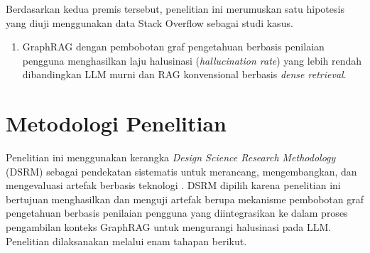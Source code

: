 Berdasarkan kedua premis tersebut, penelitian ini merumuskan satu hipotesis yang diuji menggunakan data Stack Overflow sebagai studi kasus.

\begin{enumerate}
    \item[\textbf{H1}] GraphRAG dengan pembobotan graf pengetahuan berbasis penilaian pengguna menghasilkan laju halusinasi (\emph{hallucination rate}) yang lebih rendah dibandingkan LLM murni dan RAG konvensional berbasis \emph{dense retrieval}.
\end{enumerate}

\section{Metodologi Penelitian}

Penelitian ini menggunakan kerangka \emph{Design Science Research Methodology} (DSRM) sebagai pendekatan sistematis untuk merancang, mengembangkan, dan mengevaluasi artefak berbasis teknologi \autocite{Peffers2007}. DSRM dipilih karena penelitian ini bertujuan menghasilkan dan menguji artefak berupa mekanisme pembobotan graf pengetahuan berbasis penilaian pengguna yang diintegrasikan ke dalam proses pengambilan konteks GraphRAG untuk mengurangi halusinasi pada LLM. Penelitian dilaksanakan melalui enam tahapan berikut.

